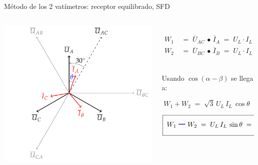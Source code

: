 \documentclass[aspectratio=169, usenames,svgnames,dvipsnames]{beamer}
\begin{document}
\begin{frame}{Método de los 2 vatímetros: \hspace{3mm}receptor equilibrado, \hspace{3mm}SFD}
    \begin{columns}
    \begin{column}{0.5\columnwidth}

        \vspace{3mm}
        \includegraphics[height=0.9\textheight]{../figs/fasores_potencia3H.pdf}
    \end{column}
    \begin{column}{0.5\columnwidth}    
        \begin{align*}
    	    W_1& 
            \;=\; 
            \overline{U}_{AC}\,\bullet\,\overline{I}_A
            \;=\;
            U_L \cdot I_L \cdot \overbrace{\cos(30^\circ - \theta)}^{\text{ver gráfico}}\\[7pt] 
    	    W_2& 
            \;=\; 
            \overline{U}_{BC}\,\bullet\,\overline{I}_B
            \;=\;
            U_L \cdot I_L \cdot \underbrace{\cos(30^\circ + \theta)}_{\text{ver gráfico}}
    	\end{align*}

        \hspace{3mm}Usando \href{https://raw.githubusercontent.com/ETSIDI-IE/tc/master/docs/diapos/TC1_Trigonometria_Complejos_LBB.pdf}{$\cos(\alpha-\beta)$} se llega a:
        
    	\[
            \boxed{\; W_1 + W_2
            \;=\; \sqrt3 \, U_L \, I_L \, \cos \theta 
            \;=\; P \;}
        \]

        \[
            \boxed{\; W_1 \, {\Large\boldsymbol{\color{blue!50!black} -}} \, W_2
            \;=\; U_L \, I_L \, \sin \theta 
            \;=\; \frac{Q}{\boldsymbol{\color{blue!50!black} \sqrt{3}}} \;}
        \]        
    \end{column}
    \end{columns}
\end{frame}
\end{document}
